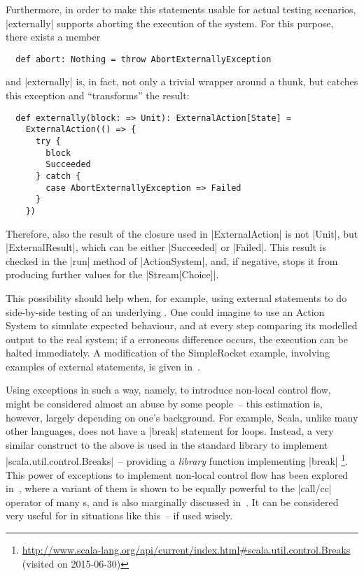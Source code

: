 Furthermore, in order to make this statements usable for actual testing scenarios, |externally|
supports aborting the execution of the system. For this purpose, there exists a member
\begin{lstlisting}
  def abort: Nothing = throw AbortExternallyException
\end{lstlisting}
and |externally| is, in fact, not only a trivial wrapper around a thunk, but catches this exception
and \enquote{transforms} the result:
\begin{lstlisting}
  def externally(block: => Unit): ExternalAction[State] = 
    ExternalAction(() => {
      try {
        block
        Succeeded
      } catch {
        case AbortExternallyException => Failed
      }
    })
\end{lstlisting}
Therefore, also the result of the closure used in |ExternalAction| is not |Unit|, but
|ExternalResult|, which can be either |Succeeded| or |Failed|. This result is checked in the |run|
method of |ActionSystem|, and, if negative, stops it from producing further values for the
|Stream[Choice]|.

This possibility should help when, for example, using external statements to do side-by-side testing
of an underlying . One could imagine to use an Action System to simulate expected
behaviour, and at every step comparing its modelled output to the real system; if a erroneous
difference occurs, the execution can be halted immediately. A modification of the SimpleRocket
example, involving examples of external statements, is given in~.

Using exceptions in such a way, namely, to introduce non-local control flow, might be considered
almost an abuse by some people~-- this estimation is, however, largely depending on one's
background. For example, Scala, unlike many other languages, does not have a |break| statement for
loops. Instead, a very similar construct to the above is used in the standard library to implement
|scala.util.control.Breaks|~-- providing a \emph{library} function implementing |break|%
\footnote{\protect\url{http://www.scala-lang.org/api/current/index.html\#scala.util.control.Breaks}
  (visited on 2015-06-30)}. This power of exceptions to implement non-local control flow has been
explored in~\cite{lillibridge1999:unchecked}, where a variant of them is shown to be equally
powerful to the |call/cc| operator of many s, and is also marginally discussed
in~\cite{pierce2002:types}. It can be considered very useful for \dsls{} in situations like this~--
if used wisely.

